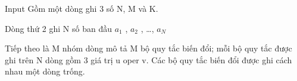 Input
Gồm một dòng ghi 3 số N, M và K.  

   Dòng thứ 2 ghi N số ban đầu $a_{1}$   , $a_{2}$   , …, $a_{N}$

    Tiếp theo là M nhóm dòng mô tả M bộ quy tắc biến đổi; mỗi bộ quy tắc được ghi trên N dòng gồm 3 giá trị u oper v. Các bộ quy tắc biến đổi được ghi cách nhau một dòng trống.